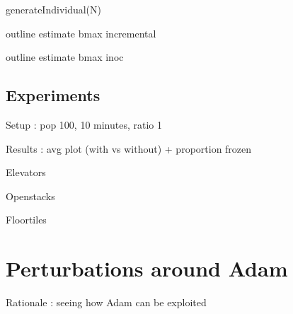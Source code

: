 \documentclass[english]{DESCARWINreport}
\def\UU{{\mathbb{U}}}
\begin{document}
\begin{algorithm}[h!]
\caption{generateIndividual(N)}
\label{algoInit}
{\small
\begin{algorithmic}[1]
 \hfill {}
\hfill {}
\REPEAT
\STATE{$t \leftarrow \UU(T)$} 
 \hfill  {}
  \hfill {}
 \hfill {}
    \hfill {}
\STATE{$n \leftarrow \UU([1,\#A_t])$} \hfill {} \label{init.state}
 \label{begin.loopInit}
\STATE{$a \leftarrow \UU(A_t)$}    \hfill {}
   \hfill {}
  \hfill {}
\ENDWHILE \label{end.loopInit}
  \hfill {}
\ENDFOR
{}
\end{algorithmic}
}
\end{algorithm}


outline estimate bmax incremental

outline estimate bmax inoc


\subsection{Experiments}

Setup : pop 100, 10 minutes, ratio 1%

Results : avg plot (with vs without) + proportion frozen

Elevators

Openstacks

Floortiles





\section{Perturbations around Adam}


Rationale : seeing how Adam can be exploited
\end{document}
